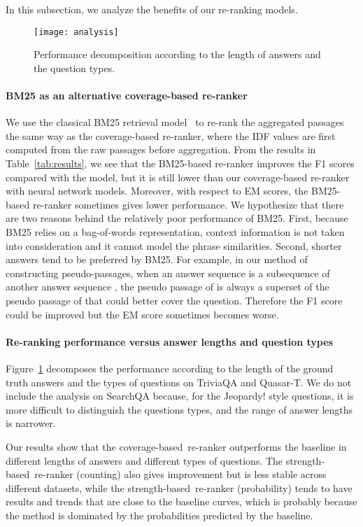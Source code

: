 \documentclass{article} \usepackage{iclr2018_conference,times}
\def \coherence {strength-based}
\def \union {coverage-based}
\begin{document}
In this subsection, we analyze the benefits of our re-ranking models.

\begin{figure}[t]
\centering
\texttt{[image: analysis]}
\vspace{-0.2in}
\caption{Performance decomposition according to the length of answers and the question types. }
\label{fig:analysis}
\end{figure}
\paragraph{BM25 as an alternative coverage-based re-ranker}{
We use the classical BM25 retrieval model~\citep{robertson2009probabilistic} to re-rank the aggregated passages the same way as the coverage-based re-ranker, where the IDF values are first computed from the raw passages before aggregation. From the results in Table~\ref{tab:results}, we see that the BM25-based re-ranker improves the F1 scores compared with the  model, but it is still lower than our coverage-based re-ranker with neural network models. Moreover, with respect to EM scores, the BM25-based re-ranker sometimes gives lower performance. We hypothesize that there are two reasons behind the relatively poor performance of BM25. First, because BM25 relies on a bag-of-words representation, context information is not taken into consideration and it cannot model the phrase similarities. Second, shorter answers tend to be preferred by BM25. For example, in our method of constructing pseudo-passages, when an answer sequence  is a subsequence of another answer sequence , the pseudo passage of  is always a superset of the pseudo passage of  that could better cover the question. Therefore the F1 score could be improved but the EM score sometimes becomes worse.
}

\paragraph{Re-ranking performance versus answer lengths and question types}
Figure~\ref{fig:analysis} decomposes the performance according to the length of the ground truth answers and the types of questions on TriviaQA and Quasar-T. We do not include the analysis on SearchQA because, for the Jeopardy! style questions, it is more difficult to distinguish the questions types, and the range of answer lengths is narrower.

Our results show that the \union\ re-ranker outperforms the baseline in different lengths of answers and different types of questions.
The \coherence\ re-ranker (counting) also gives improvement but is less stable across different datasets, while the \coherence\ re-ranker (probability) tends to have results and trends that are close to the baseline curves, which is probably because the method is dominated by the probabilities predicted by the baseline. 
\end{document}
